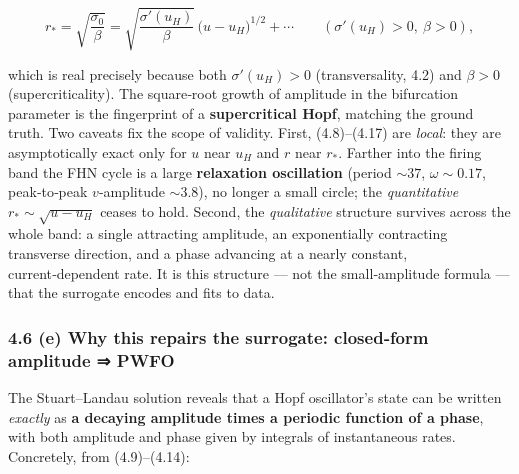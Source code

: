 \documentclass[
  11pt,
]{article}
\providecommand{\gt}{>}
\begin{document}
\[
r_*=\sqrt{\frac{\sigma_0}{\beta}}=\sqrt{\frac{\sigma'(u_H)}{\beta}}\,\big(u-u_H\big)^{1/2}+\cdots
\qquad(\sigma'(u_H)\gt 0,\ \beta\gt 0),
\tag{4.17}
\]

which is real precisely because both \(\sigma'(u_H)\gt 0\)
(transversality, 4.2) and \(\beta\gt 0\) (supercriticality). The
square‑root growth of amplitude in the bifurcation parameter is the
fingerprint of a \textbf{supercritical Hopf}, matching the ground truth.
Two caveats fix the scope of validity. First, (4.8)--(4.17) are
\emph{local}: they are asymptotically exact only for \(u\) near \(u_H\)
and \(r\) near \(r_*\). Farther into the firing band the FHN cycle is a
large \textbf{relaxation oscillation} (period \(\sim 37\),
\(\omega\sim0.17\), peak‑to‑peak \(v\)‑amplitude \(\sim 3.8\)), no
longer a small circle; the \emph{quantitative}
\(r_*\!\sim\!\sqrt{u-u_H}\) ceases to hold. Second, the
\emph{qualitative} structure survives across the whole band: a single
attracting amplitude, an exponentially contracting transverse direction,
and a phase advancing at a nearly constant, current‑dependent rate. It
is this structure --- not the small‑amplitude formula --- that the
surrogate encodes and fits to data.

\subsubsection{4.6 (e) Why this repairs the surrogate: closed‑form
amplitude ⇒
PWFO}\label{e-why-this-repairs-the-surrogate-closedform-amplitude-pwfo}

The Stuart--Landau solution reveals that a Hopf oscillator's state can
be written \emph{exactly} as \textbf{a decaying amplitude times a
periodic function of a phase}, with both amplitude and phase given by
integrals of instantaneous rates. Concretely, from (4.9)--(4.14):
\end{document}
